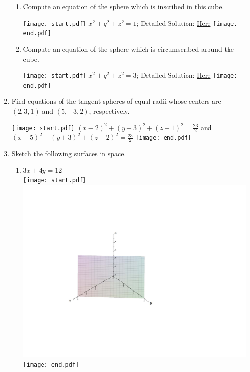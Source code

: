 \documentclass[12pt]{article}
\begin{document}
\begin{enumerate}
\begin{enumerate}

\item Compute an equation of the sphere which is inscribed in this cube.

\texttt{[image: start.pdf]}
{{$x^2+y^2+z^2=1$; Detailed Solution: \textcolor{blue}{\href{http://www.math.drexel.edu/classes/Calculus/resources/Math200HW/Solutions/01_200_Rectangular_09.pdf}{Here}}}}
\texttt{[image: end.pdf]}


\item Compute an equation of the sphere which is circumscribed around the cube.

\texttt{[image: start.pdf]}
{{$x^2+y^2+z^2=3$; Detailed Solution: \textcolor{blue}{\href{http://www.math.drexel.edu/classes/Calculus/resources/Math200HW/Solutions/01_200_Rectangular_09.pdf}{Here}}}}
\texttt{[image: end.pdf]}


\end{enumerate}

\item Find equations of the tangent spheres of equal radii whose centers are $(2,3,1)$ and $(5,-3,2)$, respectively.

\texttt{[image: start.pdf]}
{{$(x-2)^2+(y-3)^2+(z-1)^2=\frac{23}{2}$ and $(x-5)^2+(y+3)^2+(z-2)^2=\frac{23}{2}$}}
\texttt{[image: end.pdf]}


\item Sketch the following surfaces in space.

\begin{enumerate}

\item $3x+4y=12$\\

\texttt{[image: start.pdf]}
{{\includegraphics[scale=0.5]{plane.pdf}}}
\texttt{[image: end.pdf]}



\end{enumerate}
\end{enumerate}
\end{document}
